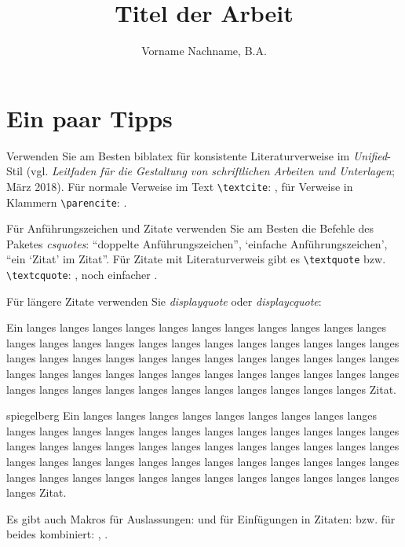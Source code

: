 \documentclass[naustrian]{univie-ling-paper}
\author{Vorname Nachname, B.A.}
\title{Titel der Arbeit}
\begin{document}
\maketitle

\makedeclaration

\tableofcontents

\section{Ein paar Tipps}\label{sec:hinweise}

Verwenden Sie am Besten \textsf{biblatex} für konsistente Literaturverweise im \emph{Unified}-Stil (vgl. \emph{Leitfaden für die Gestaltung von
schriftlichen Arbeiten und Unterlagen}; März 2018).
Für normale Verweise im Text \verb|\textcite|: \textcite[22]{brandt}, für Verweise in Klammern \verb|\parencite|: \parencite{brandt}.

Für Anführungszeichen und Zitate verwenden Sie am Besten die Befehle des Paketes \emph{csquotes}: \enquote{doppelte Anführungszeichen},
\enquote*{einfache Anführungszeichen}, \enquote{ein \enquote{Zitat} im Zitat}. Für Zitate mit Literaturverweis gibt es
\verb|\textquote| bzw. \verb|\textcquote|: , noch einfacher
.

Für längere Zitate verwenden Sie \emph{displayquote} oder \emph{displaycquote}:

\begin{displayquote}
	Ein langes langes langes langes langes langes langes langes langes langes langes langes langes langes langes langes langes langes
	langes langes langes langes langes langes langes langes langes langes langes langes langes langes langes langes langes langes langes langes
	langes langes langes langes langes langes langes langes langes langes langes langes langes langes langes langes langes langes langes langes
	Zitat.
\end{displayquote}

\begin{displaycquote}[202]{spiegelberg}
	Ein langes langes langes langes langes langes langes langes langes langes langes langes langes langes langes langes langes langes
	langes langes langes langes langes langes langes langes langes langes langes langes langes langes langes langes langes langes langes langes
	langes langes langes langes langes langes langes langes langes langes langes langes langes langes langes langes langes langes langes langes
	Zitat.
\end{displaycquote}
%
Es gibt auch Makros für Auslassungen: \textelp{} und für Einfügungen in Zitaten:  bzw. für beides kombiniert:
, .
\end{document}
